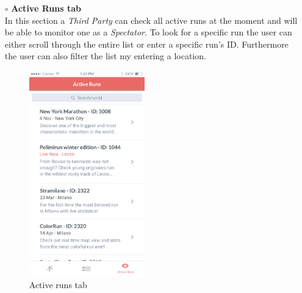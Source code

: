 \documentclass[titlepage]{article}
\begin{document}
\begin{itemize}
\begin{itemize}
\begin{itemize}
					\item[$\circ$] {\bf Active Runs tab} \\
					In this section a {\it Third Party} can check all active runs at the moment and will be able to monitor one as a {\it Spectator}. To look for a specific run the user can either scroll through the entire list or enter a specific run’s ID. Furthermore the user can also filter the list my entering a location.\\
					\begin{figure}[H]
						\center
  						\includegraphics[width=5cm]{Mockup/mockupActiveRuns.png}
  						\caption{Active runs tab}
 					 	\label{fig:Active runs}
					\end{figure}


\end{itemize}
\end{itemize}
\end{itemize}
\end{document}
